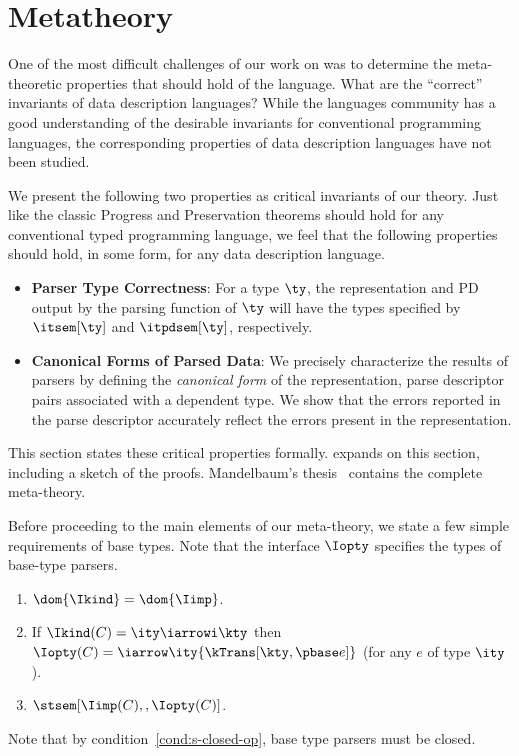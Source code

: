 \section{Metatheory}
\label{sec:ddc-meta-theory}

One of the most difficult challenges of our
work on \ddc{} was to determine the
meta-theoretic properties that should hold of the language. What are the ``correct''
invariants of data description languages?  While the languages
community has a good understanding of the
desirable invariants for conventional programming languages, the
corresponding properties of data description languages have not been
studied.

We present the following two properties as critical invariants of
our theory.  Just like the classic Progress and Preservation theorems
should hold for any conventional typed programming language,
we feel that the following properties should hold, in some form, for any data
description language.
\begin{itemize}
\item {\bf Parser Type Correctness}: For a \ddc{} type $\ty$, the
  representation and PD output by the parsing function of $\ty$ will
  have the types specified by $\itsem[\ty]$ and
  $\itpdsem[\ty]$, respectively.
  
\item {\bf Canonical Forms of Parsed Data}: We precisely
  characterize the results of \ddc{} parsers by defining the {\em
    canonical form} of the representation, parse descriptor pairs
  associated with a dependent \ddc{} type. We show that the errors
  reported in the parse descriptor accurately reflect the errors present in the
  representation.
\end{itemize}
\noindent
This section states these critical properties formally. 
 expands on this section, including
a sketch of the proofs.
Mandelbaum's thesis~\cite{mandelbaum:thesis} contains the complete meta-theory.

Before proceeding to the main elements of our meta-theory, 
we state a few simple requirements
of \ddc{} base types. Note that the interface $\Iopty$ specifies the types of base-type parsers.

\begin{condition}
\label{cond:s-base-types}
  \begin{enumerate}
  \item $\dom {\Ikind} = \dom {\Iimp}$.
  \item If $\Ikind(C) = {\ity \iarrowi \kty}$ then $\Iopty(C) =
    \iarrow \ity {\kTrans[\kty,\pbase e]}$ (for any $e$ of type $\ity$).
  \item $\stsem[\Iimp(C),,\Iopty(C)]$.
    \label{cond:s-closed-op}
  \end{enumerate}
\end{condition}
\noindent
Note that by
condition~\ref{cond:s-closed-op}, base type parsers must be closed.

